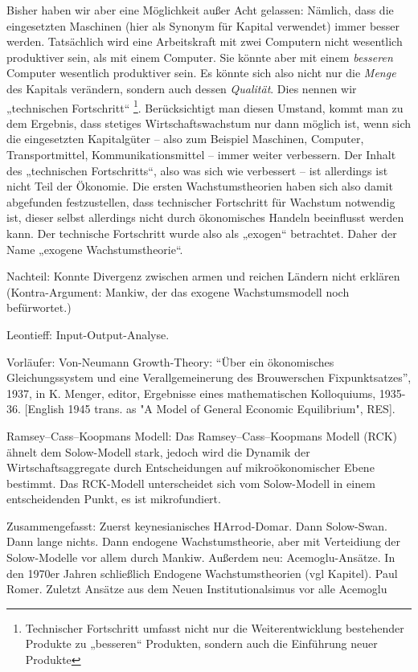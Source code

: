 Bisher haben wir aber eine Möglichkeit außer Acht gelassen: Nämlich, dass die eingesetzten Maschinen (hier als Synonym für Kapital verwendet) immer besser werden. Tatsächlich wird eine Arbeitskraft mit zwei Computern nicht wesentlich produktiver sein, als mit einem Computer. Sie könnte aber mit einem \textit{besseren} Computer wesentlich produktiver sein. Es könnte sich also nicht nur die \textit{Menge} des Kapitals verändern, sondern auch dessen \textit{Qualität}. Dies nennen wir „technischen Fortschritt“ \footnote{Technischer Fortschritt umfasst nicht nur die Weiterentwicklung bestehender Produkte zu „besseren“ Produkten, sondern auch die Einführung neuer Produkte}.
Berücksichtigt man diesen Umstand, kommt man zu dem Ergebnis, dass stetiges Wirtschaftswachstum nur dann möglich ist, wenn sich die eingesetzten Kapitalgüter – also zum Beispiel Maschinen, Computer, Transportmittel, Kommunikationsmittel – immer weiter verbessern.
Der Inhalt des „technischen Fortschritts“, also was sich wie verbessert – ist allerdings ist nicht Teil der Ökonomie. Die ersten Wachstumstheorien haben sich also damit abgefunden festzustellen, dass technischer Fortschritt für Wachstum notwendig ist, dieser selbst allerdings nicht durch ökonomisches Handeln beeinflusst werden kann. Der technische Fortschritt wurde also als „exogen“ betrachtet. Daher der Name „exogene Wachstumstheorie“.


Nachteil: Konnte Divergenz zwischen armen und reichen Ländern nicht erklären (Kontra-Argument: Mankiw, der das exogene Wachstumsmodell noch befürwortet.)


Leontieff: Input-Output-Analyse.



Vorläufer: Von-Neumann Growth-Theory: 
"`Über ein ökonomisches Gleichungssystem und eine Verallgemeinerung des Brouwerschen Fixpunktsatzes"',  1937, in K. Menger, editor, Ergebnisse eines mathematischen Kolloquiums, 1935-36. [English 1945 trans. as "A Model of General Economic Equilibrium", RES].






Ramsey–Cass–Koopmans Modell:
Das Ramsey–Cass–Koopmans Modell (RCK) ähnelt dem Solow-Modell stark, jedoch wird die Dynamik der Wirtschaftsaggregate durch Entscheidungen auf mikroökonomischer Ebene bestimmt. Das RCK-Modell unterscheidet sich vom Solow-Modell in einem entscheidenden Punkt, es ist mikrofundiert.



Zusammengefasst: Zuerst keynesianisches HArrod-Domar. Dann Solow-Swan. Dann lange nichts. Dann endogene Wachstumstheorie, aber mit Verteidiung der Solow-Modelle vor allem durch Mankiw. Außerdem neu: Acemoglu-Ansätze. 
In den 1970er Jahren schließlich Endogene Wachstumstheorien (vgl Kapitel). Paul Romer. Zuletzt Ansätze aus dem Neuen Institutionalsimus vor alle Acemoglu



